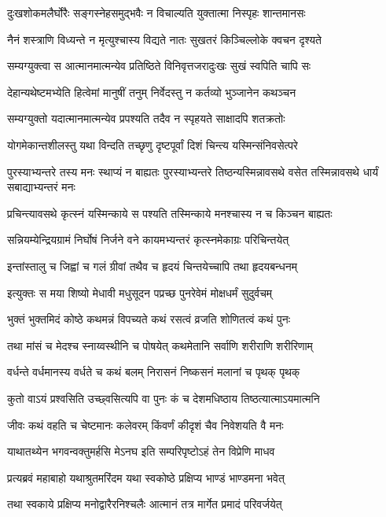 \twolineshloka
{दुःखशोकमलैर्घोरैः सङ्गस्नेहसमुद्भवैः}
{न विचाल्यति युक्तात्मा निस्पृहः शान्तमानसः}


\twolineshloka
{नैनं शस्त्राणि विध्यन्ते न मृत्युश्चास्य विद्यते}
{नातः सुखतरं किञ्चिल्लोके क्वचन दृश्यते}


\twolineshloka
{सम्यग्युक्त्वा स आत्मानमात्मन्येव प्रतिष्ठिते}
{विनिवृत्तजरादुःखः सुखं स्वपिति चापि सः}


\twolineshloka
{देहान्यथेष्टमभ्येति हित्वेमां मानुषीं तनुम्}
{निर्वेदस्तु न कर्तव्यो भुञ्जानेन कथञ्चन}


\twolineshloka
{सम्यग्युक्तो यदात्मानमात्मन्येव प्रपश्यति}
{तदैव न स्पृहयते साक्षादपि शतक्रतोः}


\twolineshloka
{योगमेकान्तशीलस्तु यथा विन्दति तच्छृणु}
{दृष्टपूर्वां दिशं चिन्त्य यस्मिन्संनिवसेत्परे}


\threelineshloka
{पुरस्याभ्यन्तरे तस्य मनः स्थाप्यं न बाह्यतः}
{पुरस्याभ्यन्तरे तिष्ठन्यस्मिन्नावसथे वसेत}
{तस्मिन्नावसथे धार्यं सबाद्याभ्यन्तरं मनः}


\twolineshloka
{प्रचिन्त्यावसथे कृत्स्नं यस्मिन्काये स पश्यति}
{तस्मिन्काये मनश्चास्य न च किञ्चन बाह्यतः}


\twolineshloka
{सन्नियम्येन्द्रियग्रामं निर्घोषं निर्जने वने}
{कायमभ्यन्तरं कृत्स्नमेकाग्रः परिचिन्तयेत्}


\twolineshloka
{इन्तांस्तालु च जिह्वां च गलं ग्रीवां तथैव च}
{हृदयं चिन्तयेच्चापि तथा हृदयबन्धनम्}


\twolineshloka
{इत्युक्तः स मया शिष्यो मेधावी मधुसूदन}
{पप्रच्छ पुनरेवेमं मोक्षधर्मं सुदुर्वचम्}


\twolineshloka
{भुक्तं भुक्तमिदं कोष्ठे कथमन्नं विपच्यते}
{कथं रसत्वं व्रजति शोणितत्वं कथं पुनः}


\twolineshloka
{तथा मांसं च मेदश्च स्नाय्वस्थीनि च पोषयेत्}
{कथमेतानि सर्वाणि शरीराणि शरीरिणाम्}


\twolineshloka
{वर्धन्ते वर्धमानस्य वर्धते च कथं बलम्}
{निरासनं निष्कसनं मलानां च पृथक् पृथक्}


\twolineshloka
{कुतो वाऽयं प्रश्वसिति उच्छ्वसित्यपि वा पुनः}
{कं च देशमधिष्ठाय तिष्ठत्यात्माऽयमात्मनि}


\twolineshloka
{जीवः कथं वहति च चेष्टमानः कलेवरम्}
{किंवर्णं कीदृशं चैव निवेशयति वै मनः}


\twolineshloka
{याथातथ्येन भगवन्वक्तुमर्हसि मेऽनघ}
{इति सम्परिपृष्टोऽहं तेन विप्रेणि माधव}


\twolineshloka
{प्रत्यब्रवं महाबाहो यथाश्रुतमरिंदम}
{यथा स्वकोष्ठे प्रक्षिप्य भाण्डं भाण्डमना भवेत्}


\twolineshloka
{तथा स्वकाये प्रक्षिप्य मनोद्वारैरनिश्चलैः}
{आत्मानं तत्र मार्गेत प्रमादं परिवर्जयेत्}


